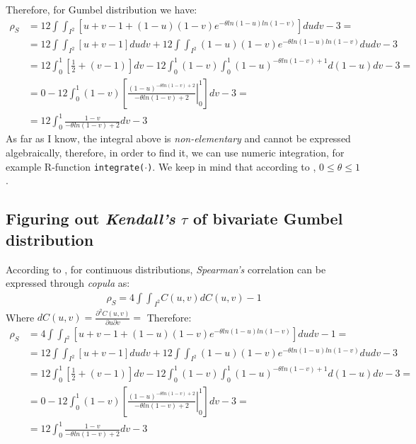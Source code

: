 \documentclass[]{article}
\begin{document}
Therefore, for Gumbel distribution we have:
	$$
	\begin{aligned}
		 \rho_S &= 12\int\int_{I^2}\left[ u+v-1+(1-u)(1-v)e^{-\theta ln(1-u) ln(1-v)} \right]dudv - 3 =\\
     &= 12\int\int_{I^2}\left[ u+v-1 \right]dudv +  12\int\int_{I^2} (1-u)(1-v)e^{-\theta ln(1-u) ln(1-v)} dudv - 3\\
     &= 12\int_0^1\left[ \frac{1}{2} + (v-1) \right]dv -  12\int_0^1(1-v)\int_0^1 (1-u)^{-\theta ln(1-v) + 1} d(1-u)dv - 3 = \\
     &= 0  - 12\int_0^1(1-v)  \left[ \left. \frac{(1-u)^{-\theta ln(1-v) + 2}}{-\theta ln(1-v) + 2}\right|_0^1 \right]  dv - 3 = \\
     &= 12\int_0^1\frac{1-v}{-\theta ln(1-v) + 2}  dv - 3
	\end{aligned}
	$$
As far as I know, the integral above is \emph{non-elementary} and cannot be expressed algebraically, therefore, in order to find it, we can use numeric integration, for example R-function \texttt{integrate($\cdot$)}. We keep in mind that according to \cite{nelsen2007introduction}, $0 \leq \theta \leq 1$.

\subsection{Figuring out \emph{Kendall's} $\tau$ of bivariate Gumbel distribution}
According to \cite{nelsen2007introduction}, for continuous distributions, \emph{Spearman's} correlation can be expressed through \emph{copula} as:
	$$
	\begin{aligned}
		 \rho_S = 4{\int\int}_{I^2}C(u, v)dC(u, v) - 1
	\end{aligned}
	$$
Where $dC(u, v) = \frac{\partial^2 C(u,v)}{\partial u\partial v} = $
Therefore:
	$$
	\begin{aligned}
		 \rho_S &= 4\int\int_{I^2}\left[ u+v-1+(1-u)(1-v)e^{-\theta ln(1-u) ln(1-v)} \right]dudv - 1 =\\
     &= 12\int\int_{I^2}\left[ u+v-1 \right]dudv +  12\int\int_{I^2} (1-u)(1-v)e^{-\theta ln(1-u) ln(1-v)} dudv - 3\\
     &= 12\int_0^1\left[ \frac{1}{2} + (v-1) \right]dv -  12\int_0^1(1-v)\int_0^1 (1-u)^{-\theta ln(1-v) + 1} d(1-u)dv - 3 = \\
     &= 0  - 12\int_0^1(1-v)  \left[ \left. \frac{(1-u)^{-\theta ln(1-v) + 2}}{-\theta ln(1-v) + 2}\right|_0^1 \right]  dv - 3 = \\
     &= 12\int_0^1\frac{1-v}{-\theta ln(1-v) + 2}  dv - 3
	\end{aligned}
	$$
\end{document}

